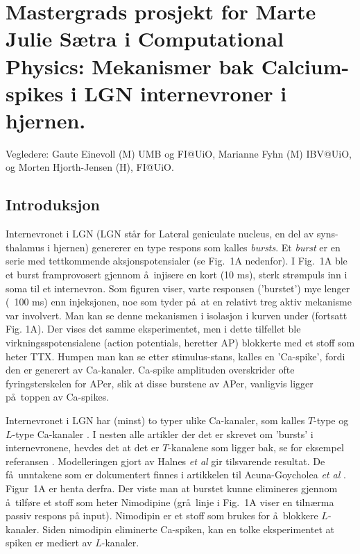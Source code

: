 \documentclass[10pt]{article}
\begin{document}
\section*{Mastergrads prosjekt for Marte Julie S\ae tra i Computational Physics: Mekanismer bak Calcium-spikes i LGN internevroner i hjernen.}

Vegledere: Gaute Einevoll (M) UMB og FI@UiO, Marianne Fyhn (M) IBV@UiO,  og Morten Hjorth-Jensen (H), FI@UiO. \newline

\subsection*{Introduksjon} 
Internevronet i LGN (LGN st\aa r for Lateral geniculate nucleus, en del av syns-thalamus i hjernen) genererer
en type respons som kalles {\em bursts}. Et {\em burst} er en serie med
tettkommende aksjonspotensialer (se Fig.~1A nedenfor). I Fig.~1A ble et
burst framprovosert gjennom \aa\ injisere en kort (10 ms), sterk
str\o mpuls inn i soma til et internevron. Som figuren viser, varte
responsen ('burstet') mye lenger (~100 ms) enn injeksjonen, noe som
tyder p\aa\ at en relativt treg aktiv mekanisme var involvert. Man kan se
denne mekanismen i isolasjon i kurven under (fortsatt Fig. 1A). Der
vises det samme eksperimentet, men i dette tilfellet ble
virkningsspotensialene (action potentials, heretter AP) blokkerte med et stoff som heter
TTX. Humpen man kan se etter stimulus-stans, kalles en 'Ca-spike',
fordi den er generert av Ca-kanaler. Ca-spike amplituden overskrider
ofte fyringsterskelen for APer, slik at disse burstene av APer,
vanligvis ligger p\aa\ toppen av Ca-spikes.

Internevronet i LGN har (minst) to typer ulike Ca-kanaler, som
kalles $T$-type og $L$-type Ca-kanaler \cite{Munsch1997}. I nesten alle
artikler der det er skrevet om 'bursts' i internevronene, hevdes det
at det er $T$-kanalene som ligger bak, se for eksempel referansen 
\cite{Pape1994,Pape1995,Zhu1999,Broicher2007}. Modelleringen gjort av Halnes {\em et al}
\cite{Halnes2011} gir tilsvarende resultat.  De f\aa\ unntakene som er dokumentert finnes i artikkelen til
Acuna-Goycholea {\em et al} \cite{AcunaGoycholea2008}. Figur~1A er henta derfra. Der
viste man at burstet kunne elimineres gjennom \aa\ tilf\o re et stoff som
heter Nimodipine (gr\aa\ linje i Fig.~1A viser en tiln\ae rma passiv
respons på input). Nimodipin er et stoff som brukes for \aa\ blokkere
$L$-kanaler. Siden nimodipin eliminerte Ca-spiken, kan en tolke
eksperimentet at spiken er mediert av $L$-kanaler.
\end{document}
